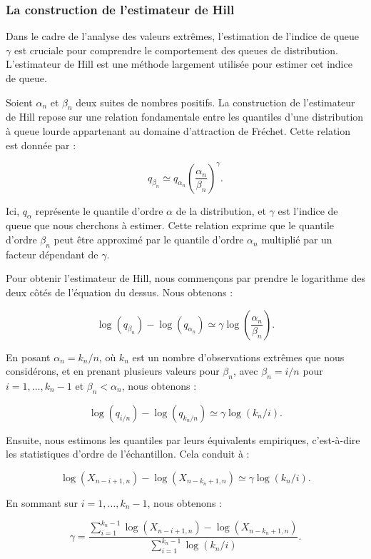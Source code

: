 \documentclass{article}
\theoremstyle{plain}
\theoremstyle{definition}
\theoremstyle{plain}
\begin{document}
\subsubsection{La construction de l’estimateur de Hill}
Dans le cadre de l'analyse des valeurs extrêmes, l'estimation de l'indice de queue \(\gamma\) est cruciale pour comprendre le comportement des queues de distribution. L'estimateur de Hill est une méthode largement utilisée pour estimer cet indice de queue.

Soient \(\alpha_n\) et \(\beta_n\) deux suites de nombres positifs. La construction de l'estimateur de Hill repose sur une relation fondamentale entre les quantiles d’une distribution à queue lourde appartenant au domaine d’attraction de Fréchet. Cette relation est donnée par :

\[
    q_{\beta_n} \simeq q_{\alpha_n} \left( \frac{\alpha_n}{\beta_n} \right)^{\gamma}.
\]

Ici, \(q_{\alpha}\) représente le quantile d'ordre \(\alpha\) de la distribution, et \(\gamma\) est l'indice de queue que nous cherchons à estimer. Cette relation exprime que le quantile d'ordre \(\beta_n\) peut être approximé par le quantile d'ordre \(\alpha_n\) multiplié par un facteur dépendant de \(\gamma\).

Pour obtenir l'estimateur de Hill, nous commençons par prendre le logarithme des deux côtés de l'équation du dessus. Nous obtenons :

\[
\log(q_{\beta_n}) - \log(q_{\alpha_n}) \simeq \gamma \log\left( \frac{\alpha_n}{\beta_n} \right).
\]

En posant $\alpha_n = k_n/n$, où \(k_n\) est un nombre d'observations extrêmes que nous considérons, et en prenant plusieurs valeurs pour \(\beta_n\), avec \(\beta_n = i/n\) pour \(i = 1, \ldots, k_n - 1\) et \(\beta_n < \alpha_n\), nous obtenons :

\[
\log(q_{i/n}) - \log(q_{k_n/n}) \simeq \gamma \log(k_n/i).
\]

Ensuite, nous estimons les quantiles par leurs équivalents empiriques, c'est-à-dire les statistiques d'ordre de l'échantillon. Cela conduit à :

\[
\log(X_{n - i + 1, n}) - \log(X_{n - k_n + 1, n}) \simeq \gamma \log(k_n / i).
\]

En sommant sur \(i = 1, \ldots, k_n - 1\), nous obtenons :

\[
\gamma = \frac{\sum_{i=1}^{k_n - 1} \log(X_{n - i + 1, n}) - \log(X_{n - k_n + 1, n})}{\sum_{i=1}^{k_n - 1} \log(k_n / i)}.
\]
\end{document}
